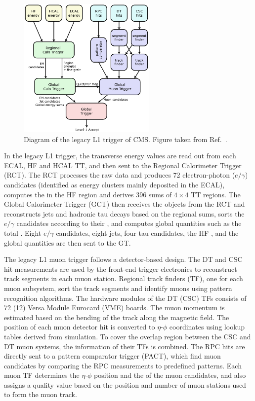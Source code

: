 \begin{figure}[!htbp]
 \centering
 \includegraphics[width=0.6\textwidth]{Figures/Experiment/CMS/L1Trigger_Legacy.png}
 \caption{Diagram of the legacy L1 trigger of CMS. Figure taken from Ref.~\cite{L1TriggerLegacyFig}.}
 \label{fig:L1TriggerLegacy}
\end{figure}

In the legacy L1 trigger, the transverse energy \Et values are read out from each ECAL, HF and HCAL TT, and then sent to the Regional Calorimeter Trigger (RCT). The RCT processes the raw data and produces 72 electron-photon ($e/\gamma$) candidates (identified as energy clusters mainly deposited in the ECAL), computes the \Et in the HF region and derives 396 \Et sums of $4\times{4}$ TT regions. The Global Calorimeter Trigger (GCT) then receives the objects from the RCT and reconstructs jets and hadronic tau decays based on the regional \Et sums, sorts the $e/\gamma$ candidates according to their \Et, and computes global quantities such as the total \Et. Eight $e/\gamma$ candidates, eight jets, four tau candidates, the HF \Et, and the global quantities are then sent to the GT.

The legacy L1 muon trigger follows a detector-based design. The DT and CSC hit measurements are used by the front-end trigger electronics to reconstruct track segments in each muon station. Regional track finders (TF), one for each muon subsystem, sort the track segments and identify muons using pattern recognition algorithms. The hardware modules of the DT (CSC) TFs consists of 72 (12) Versa Module
Eurocard (VME) boards. The muon momentum is estimated based on the bending of the track along the magnetic field. The position of each muon detector hit is converted to $\eta$-$\phi$ coordinates using lookup tables derived from simulation. To cover the overlap region between the CSC and DT muon systems, the information of their TFs is combined. The RPC hits are directly sent to a pattern comparator trigger (PACT), which find muon candidates by comparing the RPC measurements to predefined patterns. Each muon TF determines the $\eta$-$\phi$ position and the \pt of the muon candidates, and also assigns a quality value based on the position and number of muon stations used to form the muon track.

